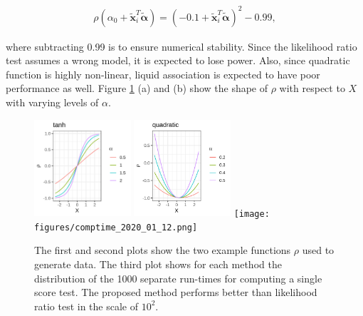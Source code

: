 \documentclass[aoas,authoryear, preprint]{imsart}
\numberwithin{equation}{section}
\theoremstyle{plain}
\begin{document}
\begin{align}
    \rho(\alpha_0 + \bm{\tilde{x}}_i^T\bm{\tilde{\alpha}}) = ( - 0.1 + \bm{\tilde{x}}_i^T\bm{\tilde{\alpha}})^2 - 0.99,
    \label{eq:data_generating2_quadratic}
\end{align}

\noindent where subtracting 0.99 is to ensure numerical stability. Since the likelihood ratio test assumes a wrong model, it is expected to lose power. Also, since quadratic function is highly non-linear, liquid association is expected to have poor performance as well. Figure \ref{fig:sim} (a) and (b) show the shape of $\rho$ with respect to $X$ with varying levels of $\alpha$. \\
\begin{figure}
         \includegraphics[width=0.32\textwidth]{figures/tanh.png}
         \includegraphics[width=0.32\textwidth]{figures/quadratic.png}
        \texttt{[image: figures/comptime\_2020\_01\_12.png]}
        \caption{The first and second plots show the two example functions $\rho$ used to generate data. The third plot shows for each method the distribution of the 1000 separate run-times for computing a single score test. The proposed method performs better than likelihood ratio test in the scale of $10^2$.}
        \label{fig:sim}
\end{figure}
\end{document}
